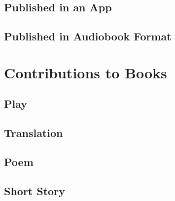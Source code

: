 \documentclass{article}
\begin{document}
\subsection{Published in an App} %
\label{sub:published_in_an_app}
\begin{refsection}
	\printbibliography[heading=none]
\end{refsection}
\subsection{Published in Audiobook Format} %
\label{sub:published_in_audiobook_format}
\begin{refsection}
	\printbibliography[heading=none]
\end{refsection}

\section{Contributions to Books} %
\label{sec:contributions_to_books}
\subsection{Play} %
\label{sub:play}
\begin{refsection}
	\printbibliography[heading=none]
\end{refsection}
\subsection{Translation} %
\label{sub:translation}
\begin{refsection}
	\printbibliography[heading=none]
\end{refsection}
\subsection{Poem} %
\label{sub:poem}
\begin{refsection}
	\printbibliography[heading=none]
\end{refsection}
\subsection{Short Story} %
\label{sub:short_story}
\begin{refsection}
	\printbibliography[heading=none]
\end{refsection}
\end{document}

